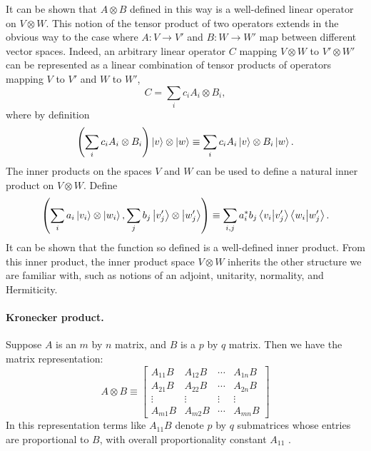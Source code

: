 It can be shown that $A \otimes B$ defined in this way is a well-defined linear
operator on $V \otimes W$. This notion of the tensor product of two operators
extends in the obvious way to the case where $A: V \rightarrow V'$ and $B: W
\rightarrow W'$ map between different vector spaces. Indeed, an arbitrary
linear operator $C$ mapping $V \otimes W$ to $V' \otimes W'$ can be represented
as a linear combination of tensor products of operators mapping $V$ to $V'$ and
$W$ to $W'$, \begin{equation*}
  C = \sum_i c_iA_i \otimes B_i,
\end{equation*}
where by definition \begin{equation*}
  \left(\sum_i c_iA_i \otimes B_i\right) \ket{v} \otimes \ket{w}
    \equiv \sum_i c_iA_i\ket{v} \otimes B_i\ket{w}.
\end{equation*}
The inner products on the spaces $V$ and $W$ can be used to define a natural
inner product on $V \otimes W$. Define \begin{equation*}
  \left(\sum_i a_i\ket{v_i} \otimes \ket{w_i}, \sum_j b_j\ket{v'_j} \otimes
    \ket{w'_j}\right) \equiv \sum_{i,j} a_i^*b_j \braket{v_i}{v'_j}
    \braket{w_i}{w'_j}.
\end{equation*}
It can be shown that the function so defined is a well-defined inner product.
From this inner product, the inner product space $V \otimes W$ inherits the
other structure we are familiar with, such as notions of an adjoint, unitarity,
normality, and Hermiticity.

\paragraph{Kronecker product.} Suppose $A$ is an $m$ by $n$ matrix, and $B$ is
a $p$ by $q$ matrix. Then we have the matrix representation: \begin{equation}
  A \otimes B \equiv \begin{bmatrix}
    A_{11}B & A_{12}B & \cdots & A_{1n}B \\
    A_{21}B & A_{22}B & \cdots & A_{2n}B \\
    \vdots & \vdots & \vdots & \vdots \\
    A_{m1}B & A_{m2}B & \cdots & A_{mn}B
  \end{bmatrix} \label{eq:kro-prod}
\end{equation}
In this representation terms like $A_{11}B$ denote $p$ by $q$ submatrices whose
entries are proportional to $B$, with overall proportionality constant $A_{11}$
.

